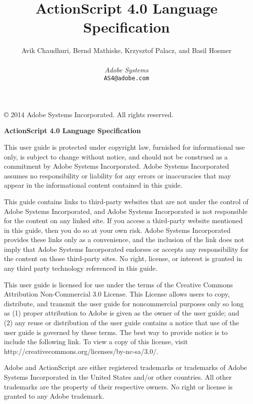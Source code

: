 \makeatletter{}\documentclass[10pt,oneside]{book}
\title{ActionScript\textsuperscript{\textregistered} 4.0 Language
  Specification}
\author{Avik Chaudhuri, Bernd Mathiske, Krzysztof
  Palacz, and Basil Hosmer \\
\\
{\it Adobe Systems} \\
{\tt AS4@adobe.com}}
\theoremstyle{note}
\begin{document}
\maketitle

\pagebreak

\copyright{} 2014 Adobe Systems Incorporated. All rights reserved. %

{\bf ActionScript\textsuperscript{\textregistered} 4.0 Language Specification}

This user guide is protected under copyright law, furnished for informational use only, is subject
to change without notice, and should not be construed as a commitment by Adobe Systems Incorporated.
Adobe Systems Incorporated assumes no responsibility or liability for any errors or inaccuracies
that may appear in the informational content contained in this guide.

This guide contains links to third-party websites that are not under the control of Adobe Systems
Incorporated, and Adobe Systems Incorporated is not responsible for the content on any linked site.
If you access a third-party website mentioned in this guide, then you do so at your own risk. Adobe
Systems Incorporated provides these links only as a convenience, and the inclusion of the link does
not imply that Adobe Systems Incorporated endorses or accepts any responsibility for the content on
those third-party sites. No right, license, or interest is granted in any third party technology
referenced in this guide.

This user guide is licensed for use under the terms of the Creative Commons Attribution
Non-Commercial 3.0 License. This License allows users to copy, distribute, and transmit the user
guide for noncommercial purposes only so long as (1) proper attribution to Adobe is given as the
owner of the user guide; and (2) any reuse or distribution of the user guide contains a notice that
use of the user guide is governed by these terms. The best way to provide notice is to include the
following link. To view a copy of this license, visit http://creativecommons.org/licenses/by-nc-sa/3.0/.

Adobe and ActionScript are either registered trademarks or trademarks of
Adobe Systems Incorporated in the United States and/or other countries. All other trademarks are the
property of their respective owners.  No right or license is granted to any Adobe trademark.
\end{document}

